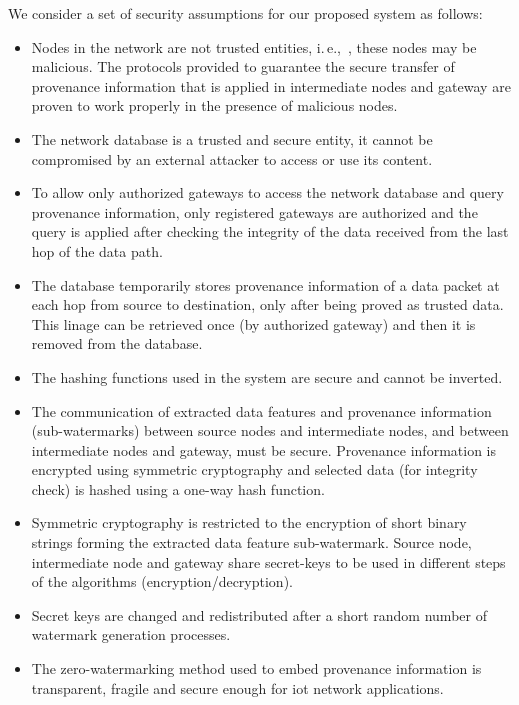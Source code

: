 \documentclass{llncs}
\newcommand{\ie}{i.\,e.,~}
\begin{document}
We consider a set of security assumptions for our proposed system as follows: 

\begin{itemize}
    \item Nodes in the network are not trusted entities, \ie, these nodes may be malicious. The protocols provided to guarantee the secure transfer of provenance information that is applied in intermediate nodes and gateway are proven to work properly in the presence of malicious nodes.
    \item The network database is a trusted and secure entity, it cannot be compromised by an external attacker to access or use its content.
    \item To allow only authorized gateways to access the network database and query provenance information, only registered gateways are authorized and the query is applied after checking the integrity of the data received from the last hop of the data path. 
    \item The database temporarily stores provenance information of a data packet at each hop from source to destination, only after being proved as trusted data. This linage can be retrieved once (by authorized gateway) and then it is removed from the database.
    \item The hashing functions used in the system are secure
    and cannot be inverted.
    \item The communication of extracted data features and provenance information (sub-watermarks) between source nodes and intermediate nodes, and between intermediate nodes and gateway, must be secure. Provenance information is encrypted using symmetric cryptography and selected data (for integrity check) is hashed using a one-way hash function.
    \item Symmetric cryptography is restricted to the encryption of short binary strings forming the extracted data feature sub-watermark. Source node, intermediate node and gateway share secret-keys to be used in different steps of the algorithms (encryption/decryption).
    

    
    \item Secret keys are changed and redistributed after a short random number of watermark generation processes. 
    \item The zero-watermarking method used to embed provenance information is transparent, fragile and secure enough for \gls*{iot} network applications.
\end{itemize}
\end{document}
